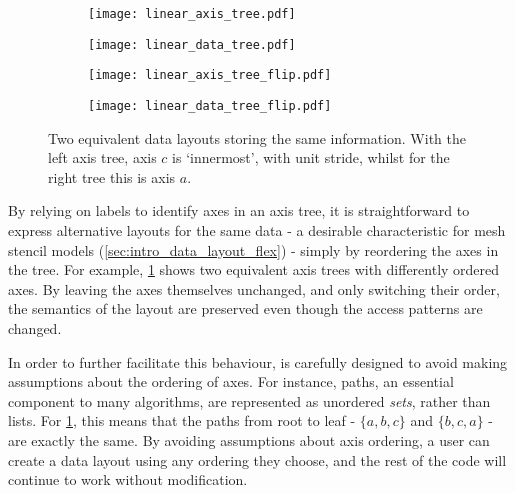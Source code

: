 \documentclass[thesis]{subfiles}
\begin{document}
\begin{figure}
  \centering
  \begin{subfigure}{.45\textwidth}
    \centering
    \begin{minipage}{.35\textwidth}
      \begin{center}
        \texttt{[image: linear\_axis\_tree.pdf]}
      \end{center}
    \end{minipage}
    \begin{minipage}{.6\textwidth}
      \begin{center}
        \texttt{[image: linear\_data\_tree.pdf]}
      \end{center}
    \end{minipage}
  \end{subfigure}
  \begin{subfigure}{.45\textwidth}
    \centering
    \begin{minipage}{.35\textwidth}
      \begin{center}
        \texttt{[image: linear\_axis\_tree\_flip.pdf]}
      \end{center}
    \end{minipage}
    \begin{minipage}{.6\textwidth}
      \begin{center}
        \texttt{[image: linear\_data\_tree\_flip.pdf]}
      \end{center}
    \end{minipage}
  \end{subfigure}

  \caption{
    Two equivalent data layouts storing the same information.
    With the left axis tree, axis $c$ is `innermost', with unit stride, whilst for the right tree this is axis $a$.
  }
  \label{fig:linear_axis_tree_flip}
\end{figure}

By relying on labels to identify axes in an axis tree, it is straightforward to express alternative layouts for the same data - a desirable characteristic for mesh stencil models (\cref{sec:intro_data_layout_flex}) - simply by reordering the axes in the tree.
For example, \cref{fig:linear_axis_tree_flip} shows two equivalent axis trees with differently ordered axes.
By leaving the axes themselves unchanged, and only switching their order, the semantics of the layout are preserved even though the access patterns are changed.

In order to further facilitate this behaviour,  is carefully designed to avoid making assumptions about the ordering of axes.
For instance, paths, an essential component to many algorithms, are represented as unordered \emph{sets}, rather than lists.
For \cref{fig:linear_axis_tree_flip}, this means that the paths from root to leaf - $\{ a, b, c \}$ and $\{ b, c, a \}$ - are exactly the same.
By avoiding assumptions about axis ordering, a user can create a data layout using any ordering they choose, and the rest of the code will continue to work without modification.
\end{document}
